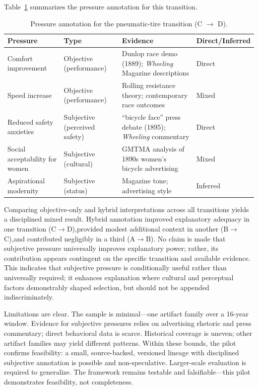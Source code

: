 \documentclass[11pt]{article}
\begin{document}
Table~\ref{tab:pilot-pressures} summarizes the pressure annotation for this transition.

\begin{table}[ht]
\centering
\caption{Pressure annotation for the pneumatic-tire transition (C $\rightarrow$ D).}
\label{tab:pilot-pressures}
\begin{tabular}{l l l p{6cm}}
\toprule
\textbf{Pressure} & \textbf{Type} & \textbf{Evidence} & \textbf{Direct/Inferred} \\
\midrule
Comfort improvement & Objective (performance) & Dunlop race demo (1889); \textit{Wheeling} Magazine descriptions & Direct \\
Speed increase & Objective (performance) & Rolling resistance theory; contemporary race outcomes & Mixed \\
Reduced safety anxieties & Subjective (perceived safety) & ``bicycle face'' press debate (1895); \textit{Wheeling} commentary & Direct \\
Social acceptability for women & Subjective (cultural) & GMTMA analysis of 1890s women's bicycle advertising & Mixed \\
Aspirational modernity & Subjective (status) & Magazine tone; advertising style & Inferred \\
\bottomrule
\end{tabular}
\end{table}

Comparing objective-only and hybrid interpretations across all transitions yields a disciplined mixed result. Hybrid annotation improved explanatory adequacy in one transition (C$\rightarrow$D),\allowbreak provided modest additional context in another (B$\rightarrow$C),\allowbreak and contributed negligibly in a third (A$\rightarrow$B). No claim is made that subjective pressure universally improves explanatory power; rather, its contribution appears contingent on the specific transition and available evidence. This indicates that subjective pressure is conditionally useful rather than universally required; it enhances explanation where cultural and perceptual factors demonstrably shaped selection, but should not be appended indiscriminately.

Limitations are clear. The sample is minimal---one artifact family over a 16-year window. Evidence for subjective pressures relies on advertising rhetoric and press commentary; direct behavioral data is scarce. Historical coverage is uneven; other artifact families may yield different patterns. Within these bounds, the pilot confirms feasibility: a small, source-backed, versioned lineage with disciplined subjective annotation is possible and non-speculative. Larger-scale evaluation is required to generalize. The framework remains testable and falsifiable---this pilot demonstrates feasibility, not completeness.
\end{document}
